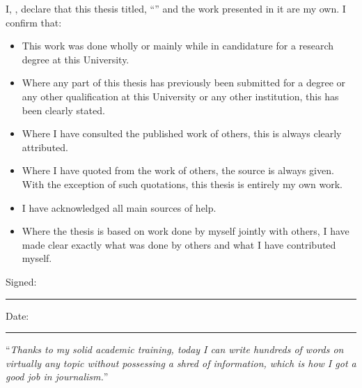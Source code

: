 \documentclass[
]{MastersDoctoralThesis} %
\begin{document}

\begin{declaration}
\addchaptertocentry{\authorshipname} %
\noindent I, \authorname, declare that this thesis titled, \enquote{\ttitle} and the work presented in it are my own. I confirm that:

\begin{itemize} 
\item This work was done wholly or mainly while in candidature for a research degree at this University.
\item Where any part of this thesis has previously been submitted for a degree or any other qualification at this University or any other institution, this has been clearly stated.
\item Where I have consulted the published work of others, this is always clearly attributed.
\item Where I have quoted from the work of others, the source is always given. With the exception of such quotations, this thesis is entirely my own work.
\item I have acknowledged all main sources of help.
\item Where the thesis is based on work done by myself jointly with others, I have made clear exactly what was done by others and what I have contributed myself.\\
\end{itemize}
 
\noindent Signed:\\
\rule[0.5em]{25em}{0.5pt} %
 
\noindent Date:\\
\rule[0.5em]{25em}{0.5pt} %
\end{declaration}

\cleardoublepage


\vspace*{0.2\textheight}

\noindent\enquote{\itshape Thanks to my solid academic training, today I can write hundreds of words on virtually any topic without possessing a shred of information, which is how I got a good job in journalism.}\bigbreak
\end{document}

